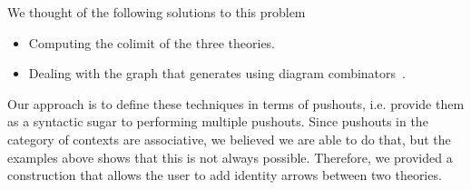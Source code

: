 We thought of the following solutions to this problem 
\begin{itemize}
    \item Computing the colimit of the three theories. 
    \item Dealing with the graph that generates  using diagram combinators~\cite{cicm2019diagrams}. 
\end{itemize}
Our approach is to define these techniques in terms of pushouts, i.e. provide them as a syntactic sugar to performing multiple pushouts. Since pushouts in the category of contexts are associative, we believed we are able to do that, but the examples above shows that this is not always possible. Therefore, we provided a construction that allows the user to add identity arrows between two theories. 


\begin{comment}
There are two different ways by which a user or a library builder can define a new theory; either by stating all its components or by reusing existing theories. While an end user might in some cases prefer the first approach for the formalization tasks, a library is more rich in information if it deploys the second approach. For example, defining a \group to be a \monoid with inverse gives us more information than what are its declarations, it also tell us about how it is related to \monoid. Most systems provide users with at least inclusions which enable them to include a verbatim version of one theory into the other, so the relation between \group and \monoid mentioned here can be captured. But, is this enough? 



\end{comment}